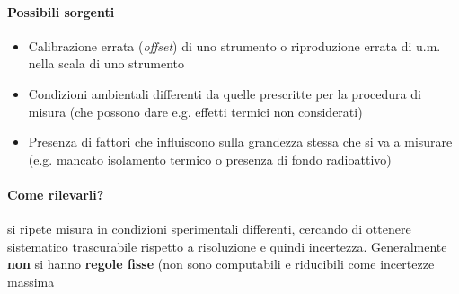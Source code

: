 \documentclass[10pt, oneside]{book}
\begin{document}
\paragraph{Possibili sorgenti}
\begin{itemize}
\item Calibrazione errata (\textit{offset}) di uno strumento o riproduzione errata di u.m. nella scala di uno strumento
\item Condizioni ambientali differenti da quelle prescritte per la procedura di misura (che possono dare e.g. effetti termici non considerati)
\item Presenza di fattori che influiscono sulla grandezza stessa che si va a misurare (e.g. mancato isolamento termico o presenza di fondo radioattivo)
\end{itemize}
\paragraph{Come rilevarli?} si ripete misura in condizioni sperimentali differenti, cercando di ottenere sistematico trascurabile rispetto a risoluzione e quindi incertezza. Generalmente \textbf{non} si hanno \textbf{regole fisse} (non sono computabili e riducibili come incertezze massima
\end{document}
